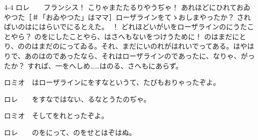 \documentclass[tate,paper=b6j,jafontsize=9pt]{jlreq}
\begin{document}
\begin{azconvIndented}{4\zw}{-4\zw}
ロレ　　フランシス！ こりゃまたたるりやうぢゃ！ あれほどにひれておゐやつた{\small ［＃「おゐやつた」はママ］}ローザラインをてゝおしまやったか？ さればいのはにはらいでにるとえた。　！ どれほどいがいをローザラインのにうたことやら？ のをにしたことやら、はさへもないをつけうために！ のはまだにとり、ののはまだのにってゐる。それ、まだにいのれがはれいでってある。はやはりで、あのはのであったなら、それはローザラインのであったに、なりゃ、がったか？ すれば、一をへしめ……はのる、さへもにあらず。

ロミオ　はローザラインにをすなというて、たびもおりゃったぞよ。

ロレ　　をすなではない、るなとうたのぢゃ。

ロミオ　そしてをれとったぞよ。

ロレ　　のをにって、のをせとはぞはぬ。


\end{azconvIndented}
\end{document}
